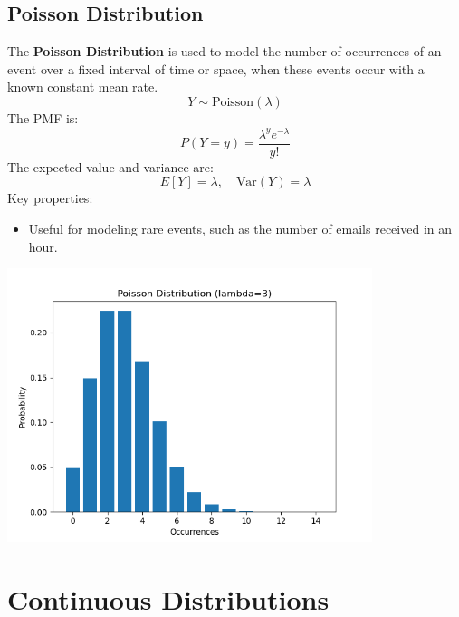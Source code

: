 \documentclass{article}
\begin{document}
\subsection{Poisson Distribution}
The \textbf{Poisson Distribution} is used to model the number of occurrences of an event over a fixed interval of time or space, when these events occur with a known constant mean rate.
\[
Y \sim \text{Poisson}(\lambda)
\]
The PMF is:
\[
P(Y = y) = \frac{\lambda^y e^{-\lambda}}{y!}
\]
The expected value and variance are:
\[
E[Y] = \lambda, \quad \text{Var}(Y) = \lambda
\]
Key properties:
\begin{itemize}
    \item Useful for modeling rare events, such as the number of emails received in an hour.
\end{itemize}
\begin{center}
    \includegraphics[width=0.8\textwidth]{./graphs/probDist/poisson_distribution.png}
\end{center}

\newpage
\section{Continuous Distributions}
\end{document}
